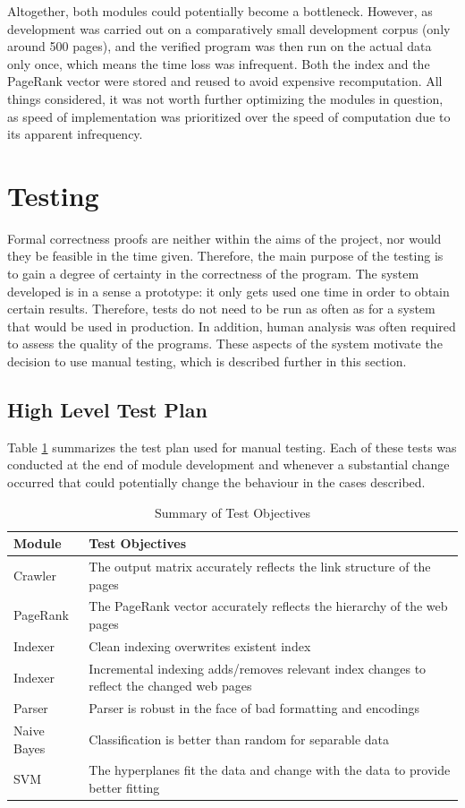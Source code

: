 \documentclass[12pt,notitlepage,twoside]{scrreprt}
\begin{document}
Altogether, both modules could potentially become a bottleneck. However, as development
was carried out on a comparatively small development corpus (only around 500 pages), and
the verified program was then run on the actual data only once, which means the time loss
was infrequent. Both the index and the PageRank vector were stored and reused to avoid
expensive recomputation. All things considered, it was not worth further optimizing the
modules in question, as speed of implementation was prioritized over the speed of
computation due to its apparent infrequency. 

\section{Testing}
Formal correctness proofs are neither within the aims of the project, nor would they be
feasible in the time given. Therefore, the main purpose of the testing is to gain a degree
of certainty in the correctness of the program. The system developed is in a sense a
prototype: it only gets used one time in order to obtain certain results. Therefore, tests
do not need to be run as often as for a system that would be used in production. In
addition, human analysis was often required to assess the quality of the programs. These
aspects of the system motivate the decision to use manual testing, which is described
further in this section. 
\subsection{High Level Test Plan}
Table \ref{tab:test} summarizes the test plan used for manual testing. Each of these tests
was conducted at the end of module development and whenever a substantial change occurred
that could potentially change the behaviour in the cases described.
\begin{table}[h!]
	\begin{tabular}[h!]{l p{12cm}}
	\textbf{Module} & \textbf{Test Objectives}\\ \hline
Crawler & The output matrix accurately reflects the link structure of the pages \\
PageRank & The PageRank vector accurately reflects the hierarchy of the web pages \\
Indexer & Clean indexing overwrites existent index \\
Indexer & Incremental indexing adds/removes relevant index changes to reflect the changed
web pages \\
Parser & Parser is robust in the face of bad formatting and encodings \\
Naive Bayes & Classification is better than random for separable data \\
SVM & The hyperplanes fit the data and change with the data to provide better fitting 
\end{tabular}
\caption{Summary of Test Objectives\label{tab:test}}
\end{table}
\end{document}
